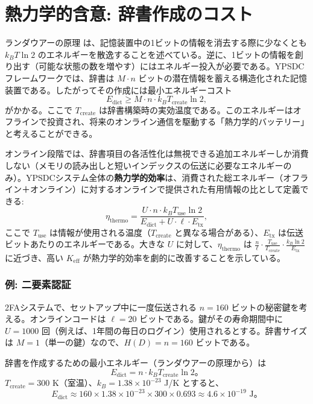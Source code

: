 \documentclass[12pt,a4paper]{article}
\theoremstyle{definition}
\theoremstyle{remark}
\newcommand{\Keff}{K_{\mathrm{eff}}}
\begin{document}
	\section{熱力学的含意: 辞書作成のコスト}
	\label{sec:thermo}
	
	ランダウアーの原理 \cite{Landauer1961} は、記憶装置中の1ビットの情報を消去する際に少なくとも $k_B T \ln 2$ のエネルギーを散逸することを述べている。逆に、1ビットの情報を創り出す（可能な状態の数を増やす）にはエネルギー投入が必要である。YPSDCフレームワークでは、辞書は $M \cdot n$ ビットの潜在情報を蓄える構造化された記憶装置である。したがってその作成には最小エネルギーコスト
	\begin{equation}
		E_{\text{dict}} \ge M \cdot n \cdot k_B T_{\text{create}} \ln 2, \label{eq:thermo-cost}
	\end{equation}
	がかかる。ここで $T_{\text{create}}$ は辞書構築時の実効温度である。このエネルギーはオフラインで投資され、将来のオンライン通信を駆動する「熱力学的バッテリー」と考えることができる。
	
	オンライン段階では、辞書項目の各活性化は無視できる追加エネルギーしか消費しない（メモリの読み出しと短いインデックスの伝送に必要なエネルギーのみ）。YPSDCシステム全体の\textbf{熱力学的効率}は、消費された総エネルギー（オフライン＋オンライン）に対するオンラインで提供された有用情報の比として定義できる:
	\begin{equation}
		\eta_{\text{thermo}} = \frac{U \cdot n \cdot k_B T_{\text{use}} \ln 2}{E_{\text{dict}} + U \cdot \ell \cdot E_{\text{tx}}}, \label{eq:thermo}
	\end{equation}
	ここで $T_{\text{use}}$ は情報が使用される温度（$T_{\text{create}}$ と異なる場合がある）、$E_{\text{tx}}$ は伝送ビットあたりのエネルギーである。大きな $U$ に対して、$\eta_{\text{thermo}}$ は $\frac{n}{\ell} \cdot \frac{T_{\text{use}}}{T_{\text{create}}} \cdot \frac{k_B \ln 2}{E_{\text{tx}}}$ に近づき、高い $\Keff$ が熱力学的効率を劇的に改善することを示している。
	
	\subsubsection{例: 二要素認証}
	2FAシステムで、セットアップ中に一度伝送される $n = 160$ ビットの秘密鍵を考える。オンラインコードは $\ell = 20$ ビットである。鍵がその寿命期間中に $U = 1000$ 回（例えば、1年間の毎日のログイン）使用されるとする。辞書サイズは $M = 1$（単一の鍵）なので、$H(D) = n = 160$ ビットである。
	
	辞書を作成するための最小エネルギー（ランダウアーの原理から）は
	\[
	E_{\text{dict}} = n \cdot k_B T_{\text{create}} \ln 2。
	\]
	$T_{\text{create}} = 300$ K（室温）、$k_B = 1.38 \times 10^{-23}$ J/K とすると、
	\[
	E_{\text{dict}} \approx 160 \times 1.38 \times 10^{-23} \times 300 \times 0.693 \approx 4.6 \times 10^{-19} \text{ J}。
	\]
	
\end{document}
